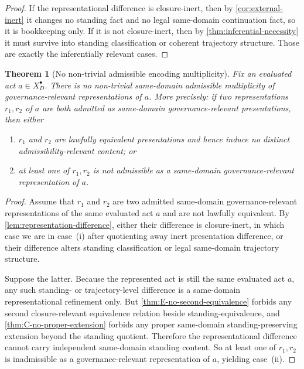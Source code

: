 \documentclass[11pt]{article}
\theoremstyle{plain}
\newtheorem{theorem}{Theorem}[section]
\theoremstyle{definition}
\newcommand{\Eval}{X_D^{\bullet}}
\begin{document}
\begin{proof}
If the representational difference is closure-inert, then by \cref{cor:external-inert} it changes no standing fact and no legal same-domain continuation fact, so it is bookkeeping only. If it is not closure-inert, then by \cref{thm:inferential-necessity} it must survive into standing classification or coherent trajectory structure. Those are exactly the inferentially relevant cases.
\end{proof}

\begin{theorem}[No non-trivial admissible encoding multiplicity]
\label{thm:no-encoding-multiplicity}
Fix an evaluated act $a\in\Eval$. There is no non-trivial same-domain admissible multiplicity of governance-relevant representations of $a$. More precisely: if two representations $r_1,r_2$ of $a$ are both admitted as same-domain governance-relevant presentations, then either
\begin{enumerate}[label=(\roman*), leftmargin=2.5em]
    \item $r_1$ and $r_2$ are lawfully equivalent presentations and hence induce no distinct admissibility-relevant content; or
    \item at least one of $r_1,r_2$ is not admissible as a same-domain governance-relevant representation of $a$.
\end{enumerate}
\end{theorem}

\begin{proof}
Assume that $r_1$ and $r_2$ are two admitted same-domain governance-relevant representations of the same evaluated act $a$ and are not lawfully equivalent. By \cref{lem:representation-difference}, either their difference is closure-inert, in which case we are in case~(i) after quotienting away inert presentation difference, or their difference alters standing classification or legal same-domain trajectory structure.

Suppose the latter. Because the represented act is still the same evaluated act $a$, any such standing- or trajectory-level difference is a same-domain representational refinement only. But \cref{thm:E-no-second-equivalence} forbids any second closure-relevant equivalence relation beside standing-equivalence, and \cref{thm:C-no-proper-extension} forbids any proper same-domain standing-preserving extension beyond the standing quotient. Therefore the representational difference cannot carry independent same-domain standing content. So at least one of $r_1,r_2$ is inadmissible as a governance-relevant representation of $a$, yielding case~(ii).
\end{proof}
\end{document}
